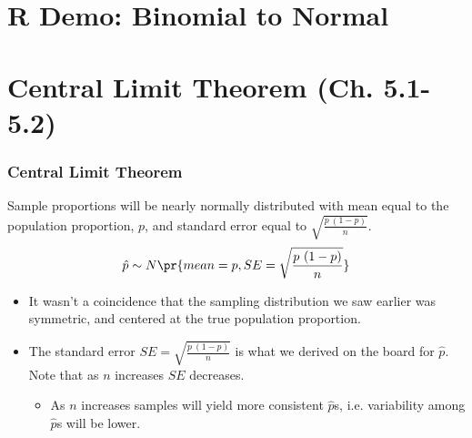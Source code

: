 \documentclass[t,compress,mathserif]{beamer}
\begin{document}


\section{R Demo: Binomial to Normal}


\section{Central Limit Theorem (Ch. 5.1-5.2)}


\begin{frame}
\frametitle{Central Limit Theorem}

{Sample proportions will be nearly normally distributed with mean equal to the population proportion, $p$, and standard error equal to $\sqrt{\frac{p~(1-p)}{n}}$.
\[ \hat{p} \sim N \pr{ mean = p, SE = \sqrt{\frac{p~(1-p)}{n}} } \]
}

\begin{itemize}

\item It wasn't a coincidence that the sampling distribution we saw earlier was symmetric, and centered at the true population proportion.

\item The standard error $SE =  \sqrt{\frac{p~(1-p)}{n}}$ is what we derived on the board for $\hat{p}$. Note that as $n$ increases $SE$ decreases.
\begin{itemize}
\item As $n$ increases samples will yield more consistent $\hat{p}$s, i.e. variability among $\hat{p}$s will be lower.
\end{itemize}

\end{itemize}

\end{frame}

\end{document}
